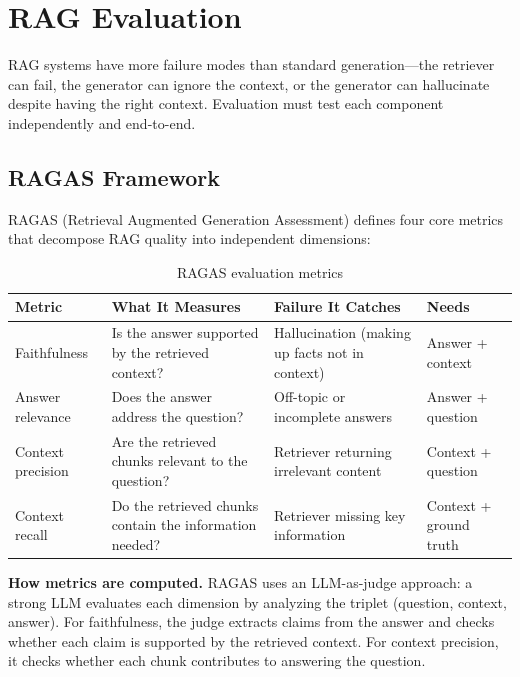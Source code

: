\section{RAG Evaluation}
\label{sec:rag_eval}

RAG systems have more failure modes than standard generation---the retriever can fail, the generator can ignore the context, or the generator can hallucinate despite having the right context. Evaluation must test each component independently and end-to-end.

\subsection{RAGAS Framework}

RAGAS (Retrieval Augmented Generation Assessment) defines four core metrics that decompose RAG quality into independent dimensions:

\begin{table}[H]
\centering
\caption{RAGAS evaluation metrics}
\begin{tabularx}{\textwidth}{lXXl}
\toprule
\textbf{Metric} & \textbf{What It Measures} & \textbf{Failure It Catches} & \textbf{Needs} \\
\midrule
Faithfulness & Is the answer supported by the retrieved context? & Hallucination (making up facts not in context) & Answer + context \\
Answer relevance & Does the answer address the question? & Off-topic or incomplete answers & Answer + question \\
Context precision & Are the retrieved chunks relevant to the question? & Retriever returning irrelevant content & Context + question \\
Context recall & Do the retrieved chunks contain the information needed? & Retriever missing key information & Context + ground truth \\
\bottomrule
\end{tabularx}
\end{table}

\textbf{How metrics are computed.} RAGAS uses an LLM-as-judge approach: a strong LLM evaluates each dimension by analyzing the triplet (question, context, answer). For faithfulness, the judge extracts claims from the answer and checks whether each claim is supported by the retrieved context. For context precision, it checks whether each chunk contributes to answering the question.

